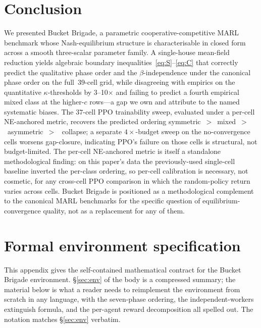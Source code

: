 \documentclass{anvil-paper}
\begin{document}
\section*{Conclusion}

We presented Bucket Brigade, a parametric cooperative-competitive MARL
benchmark whose Nash-equilibrium structure is characterisable in closed form
across a smooth three-scalar parameter family. A single-house mean-field
reduction yields algebraic boundary inequalities~\eqref{eq:S}--\eqref{eq:C}
that correctly predict the qualitative phase order and the
$\beta$-independence under the canonical phase order on the full~$39$-cell
grid, while disagreeing with empirics on the quantitative
$\kappa$-thresholds by 3--10$\times$ and failing to predict a fourth
empirical \textsf{mixed} class at the higher-$c$ rows---a gap we own and
attribute to the named systematic biases. The $37$-cell PPO trainability
sweep, evaluated under a per-cell NE-anchored metric, recovers the
predicted ordering
\textsf{symmetric}~$>$~\textsf{mixed}~$>$~\textsf{asymmetric}~$>$~%
\textsf{collapse}; a separate $4{\times}$-budget sweep on the
no-convergence cells worsens gap-closure, indicating PPO's failure on those
cells is structural, not budget-limited. The per-cell NE-anchored metric is itself a
standalone methodological finding: on this paper's data the previously-used
single-cell baseline inverted the per-class ordering, so per-cell
calibration is necessary, not cosmetic, for any cross-cell PPO comparison
in which the random-policy return varies across cells. Bucket Brigade is positioned as a methodological
complement to the canonical MARL benchmarks for the specific question of
equilibrium-convergence quality, not as a replacement for any of them.




\appendix

\section{Formal environment specification}
\label{app:envspec}

This appendix gives the self-contained mathematical contract for the Bucket
Brigade environment. \S\ref{sec:env} of the body is a compressed summary;
the material below is what a reader needs to reimplement the environment
from scratch in any language, with the seven-phase ordering, the
independent-workers extinguish formula, and the per-agent reward
decomposition all spelled out. The notation matches \S\ref{sec:env}
verbatim.
\end{document}
